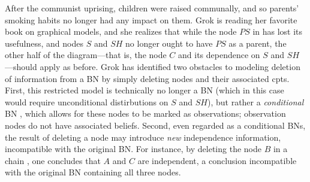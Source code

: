 \documentclass{article}
\numberwithin{equation}{section}
\begin{document}
	\begin{example}[restriction]\label{ex:grok-ablate}
		After the communist uprising, children were raised communally, and so parents' smoking habits no longer had any impact on them. Grok is reading her favorite book on graphical models, and she realizes that while the node $\mathit{PS}$ in  has lost its usefulness, and nodes $S$ and $\mathit{SH}$ no longer ought to have $\mathit{PS}$ as a parent, the other half of the diagram---that is, the node $C$ and its dependence on $S$ and $\mathit{SH}$---should apply as before.
%		
		Grok has identified two obstacles to modeling deletion of information from a BN by simply deleting nodes and their associated cpts.
		First, this restricted model is technically no longer a
                BN (which in this case would require unconditional distirbutions on $S$ and $\mathit{SH}$), but rather a \emph{conditional} BN
                \parencite{koller2009probabilistic}%
				, which
				allows for these
                nodes to be marked as observations; observation nodes
                do not have associated beliefs.  
		Second, even regarded as a conditional BNs, the result of deleting a node may introduce \emph{new} independence information, incompatible with the original BN.
		For instance, by deleting the node $B$ in a chain 
		\scalebox{0.6}{
		\begin{tikzcd}[dpad={light pad}, column sep = 1.3em, AmpRep]
			A \ar[r] \& B \ar[r] \& C
		\end{tikzcd}},
		one concludes that $A$ and $C$ are independent, a
               conclusion incompatible with the original BN
               containing all three nodes.   



\end{example}
\end{document}
